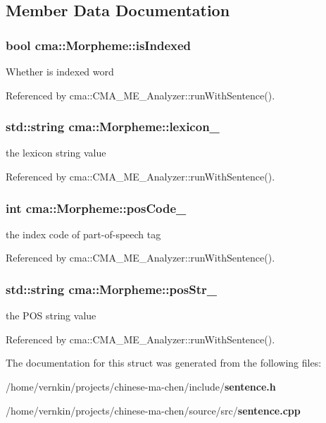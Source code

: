 \subsection{Member Data Documentation}
\subsubsection[{isIndexed}]{\setlength{\rightskip}{0pt plus 5cm}bool {\bf cma::Morpheme::isIndexed}}\label{structcma_1_1Morpheme_abef7ac799b458e7d4526fef0b97d8018}
Whether is indexed word 

Referenced by cma::CMA\_\-ME\_\-Analyzer::runWithSentence().
\subsubsection[{lexicon\_\-}]{\setlength{\rightskip}{0pt plus 5cm}std::string {\bf cma::Morpheme::lexicon\_\-}}\label{structcma_1_1Morpheme_a1054ad519e1ebb80ec71cd21b8ad2a78}
the lexicon string value 

Referenced by cma::CMA\_\-ME\_\-Analyzer::runWithSentence().
\subsubsection[{posCode\_\-}]{\setlength{\rightskip}{0pt plus 5cm}int {\bf cma::Morpheme::posCode\_\-}}\label{structcma_1_1Morpheme_a883d0df2e303ce7bd5953bfa913a88ef}
the index code of part-\/of-\/speech tag 

Referenced by cma::CMA\_\-ME\_\-Analyzer::runWithSentence().
\subsubsection[{posStr\_\-}]{\setlength{\rightskip}{0pt plus 5cm}std::string {\bf cma::Morpheme::posStr\_\-}}\label{structcma_1_1Morpheme_a21b273edef21e9efd50956f926cdaeab}
the POS string value 

Referenced by cma::CMA\_\-ME\_\-Analyzer::runWithSentence().

The documentation for this struct was generated from the following files:\begin{DoxyCompactItemize}
\item 
/home/vernkin/projects/chinese-\/ma-\/chen/include/{\bf sentence.h}\item 
/home/vernkin/projects/chinese-\/ma-\/chen/source/src/{\bf sentence.cpp}\end{DoxyCompactItemize}
